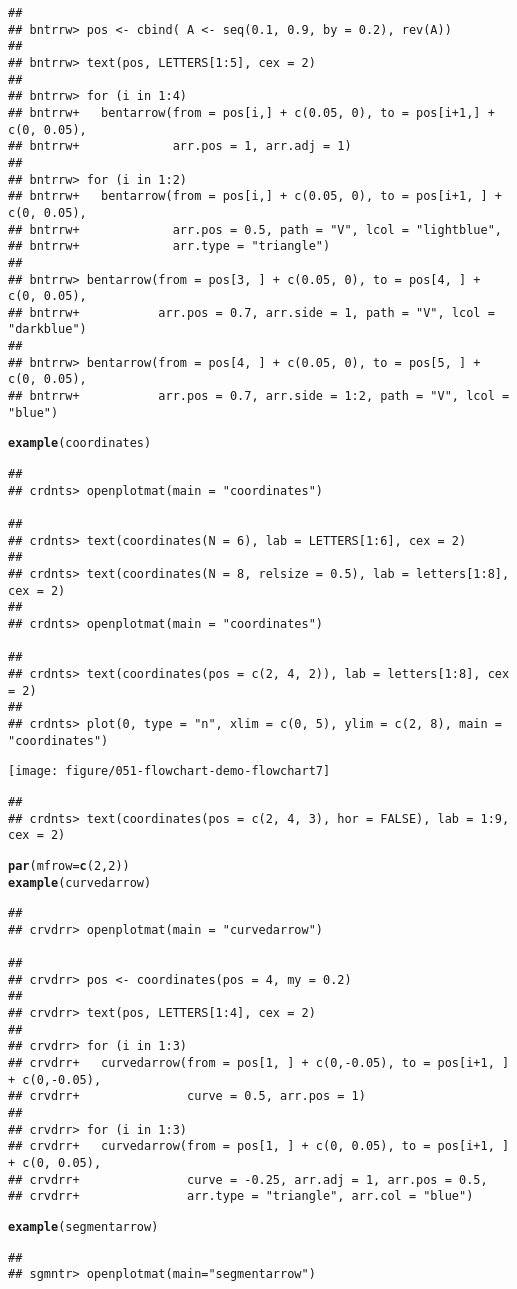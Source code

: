 \documentclass{article}\usepackage[]{graphicx}\usepackage[]{color}
\makeatletter
\def\maxwidth{ %
  \ifdim\Gin@nat@width>\linewidth
    \linewidth
  \else
    \Gin@nat@width
  \fi
}
\newcommand{\hlfunctioncall}[1]{\textcolor[rgb]{0.501960784313725,0,0.329411764705882}{\textbf{#1}}}%
\newenvironment{kframe}{%
 \def\at@end@of@kframe{}%
 \ifinner\ifhmode%
  \def\at@end@of@kframe{\end{minipage}}%
  \begin{minipage}{\columnwidth}%
 \fi\fi%
 \def\FrameCommand##1{\hskip\@totalleftmargin \hskip-\fboxsep
 \colorbox{shadecolor}{##1}\hskip-\fboxsep
     \hskip-\linewidth \hskip-\@totalleftmargin \hskip\columnwidth}%
 \MakeFramed {\advance\hsize-\width
   \@totalleftmargin\z@ \linewidth\hsize
   \@setminipage}}%
 {\par\unskip\endMakeFramed%
 \at@end@of@kframe}
\newenvironment{knitrout}{}{} %
\makeatother
\begin{document}
\begin{knitrout}
\begin{kframe}
\begin{verbatim}
## 
## bntrrw> pos <- cbind( A <- seq(0.1, 0.9, by = 0.2), rev(A))
## 
## bntrrw> text(pos, LETTERS[1:5], cex = 2)
## 
## bntrrw> for (i in 1:4) 
## bntrrw+   bentarrow(from = pos[i,] + c(0.05, 0), to = pos[i+1,] + c(0, 0.05),
## bntrrw+             arr.pos = 1, arr.adj = 1)
## 
## bntrrw> for (i in 1:2) 
## bntrrw+   bentarrow(from = pos[i,] + c(0.05, 0), to = pos[i+1, ] + c(0, 0.05),
## bntrrw+             arr.pos = 0.5, path = "V", lcol = "lightblue", 
## bntrrw+             arr.type = "triangle")
## 
## bntrrw> bentarrow(from = pos[3, ] + c(0.05, 0), to = pos[4, ] + c(0, 0.05),
## bntrrw+           arr.pos = 0.7, arr.side = 1, path = "V", lcol = "darkblue")
## 
## bntrrw> bentarrow(from = pos[4, ] + c(0.05, 0), to = pos[5, ] + c(0, 0.05),
## bntrrw+           arr.pos = 0.7, arr.side = 1:2, path = "V", lcol = "blue")
\end{verbatim}
\begin{alltt}
\hlfunctioncall{example}(coordinates)
\end{alltt}
\begin{verbatim}
## 
## crdnts> openplotmat(main = "coordinates")

## 
## crdnts> text(coordinates(N = 6), lab = LETTERS[1:6], cex = 2)
## 
## crdnts> text(coordinates(N = 8, relsize = 0.5), lab = letters[1:8], cex = 2)
## 
## crdnts> openplotmat(main = "coordinates")

## 
## crdnts> text(coordinates(pos = c(2, 4, 2)), lab = letters[1:8], cex = 2)
## 
## crdnts> plot(0, type = "n", xlim = c(0, 5), ylim = c(2, 8), main = "coordinates")
\end{verbatim}
\end{kframe}
\texttt{[image: figure/051-flowchart-demo-flowchart7]} 
\begin{kframe}\begin{verbatim}
## 
## crdnts> text(coordinates(pos = c(2, 4, 3), hor = FALSE), lab = 1:9, cex = 2)
\end{verbatim}
\begin{alltt}
\hlfunctioncall{par}(mfrow = \hlfunctioncall{c}(2, 2))
\hlfunctioncall{example}(curvedarrow)
\end{alltt}
\begin{verbatim}
## 
## crvdrr> openplotmat(main = "curvedarrow")

## 
## crvdrr> pos <- coordinates(pos = 4, my = 0.2)
## 
## crvdrr> text(pos, LETTERS[1:4], cex = 2)
## 
## crvdrr> for (i in 1:3) 
## crvdrr+   curvedarrow(from = pos[1, ] + c(0,-0.05), to = pos[i+1, ] + c(0,-0.05),
## crvdrr+               curve = 0.5, arr.pos = 1)
## 
## crvdrr> for (i in 1:3) 
## crvdrr+   curvedarrow(from = pos[1, ] + c(0, 0.05), to = pos[i+1, ] + c(0, 0.05),
## crvdrr+               curve = -0.25, arr.adj = 1, arr.pos = 0.5, 
## crvdrr+               arr.type = "triangle", arr.col = "blue")
\end{verbatim}
\begin{alltt}
\hlfunctioncall{example}(segmentarrow)
\end{alltt}
\begin{verbatim}
## 
## sgmntr> openplotmat(main="segmentarrow")


\end{verbatim}
\end{kframe}
\end{knitrout}
\end{document}

